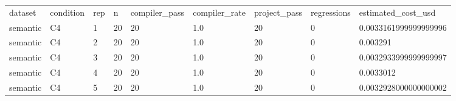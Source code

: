 \begin{tabular}{lllllllll}
dataset & condition & rep & n & compiler\_pass & compiler\_rate & project\_pass & regressions & estimated\_cost\_usd \\
semantic & C4 & 1 & 20 & 20 & 1.0 & 20 & 0 & 0.0033161999999999996 \\
semantic & C4 & 2 & 20 & 20 & 1.0 & 20 & 0 & 0.003291 \\
semantic & C4 & 3 & 20 & 20 & 1.0 & 20 & 0 & 0.0032933999999999997 \\
semantic & C4 & 4 & 20 & 20 & 1.0 & 20 & 0 & 0.0033012 \\
semantic & C4 & 5 & 20 & 20 & 1.0 & 20 & 0 & 0.0032928000000000002 \\
\end{tabular}